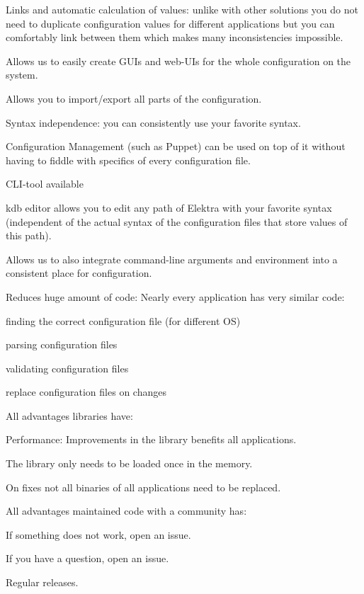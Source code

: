 \begin{DoxyItemize}
\item Links and automatic calculation of values\+: unlike with other solutions you do not need to duplicate configuration values for different applications but you can comfortably link between them which makes many inconsistencies impossible.
\item Allows us to easily create G\+U\+Is and web-\/\+U\+Is for the whole configuration on the system.
\item Allows you to import/export all parts of the configuration.
\item Syntax independence\+: you can consistently use your favorite syntax.
\item Configuration Management (such as Puppet) can be used on top of it without having to fiddle with specifics of every configuration file.
\item C\+L\+I-\/tool available
\item {\ttfamily kdb editor} allows you to edit any path of Elektra with your favorite syntax (independent of the actual syntax of the configuration files that store values of this path).
\item Allows us to also integrate command-\/line arguments and environment into a consistent place for configuration.
\item Reduces huge amount of code\+: Nearly every application has very similar code\+:
\begin{DoxyItemize}
\item finding the correct configuration file (for different OS)
\item parsing configuration files
\item validating configuration files
\item replace configuration files on changes
\end{DoxyItemize}
\item All advantages libraries have\+:
\begin{DoxyItemize}
\item Performance\+: Improvements in the library benefits all applications.
\item The library only needs to be loaded once in the memory.
\item On fixes not all binaries of all applications need to be replaced.
\end{DoxyItemize}
\item All advantages maintained code with a community has\+:
\begin{DoxyItemize}
\item If something does not work, open an issue.
\item If you have a question, open an issue.
\item Regular releases.
\end{DoxyItemize}
\end{DoxyItemize}

